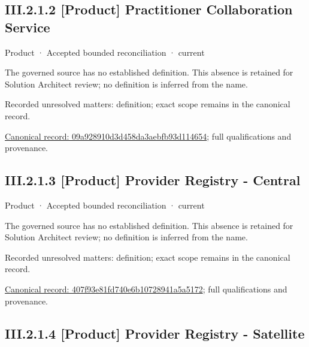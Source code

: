 \subsection*{III.2.1.2 [Product] Practitioner Collaboration Service}
\label{navigation:III.2.1.2}

\label{element:09a928910d3d458da3aebfb93d114654}
{\small Product · Accepted bounded reconciliation · current}\par

The governed source has no established definition. This absence is retained for Solution Architect review; no definition is inferred from the name.


{\small Recorded unresolved matters: definition; exact scope remains in the canonical record.}\par
{\footnotesize \href{../../../../continuum/business/product/09a928910d3d458da3aebfb93d114654.md}{Canonical record: 09a928910d3d458da3aebfb93d114654}; full qualifications and provenance.}\par
\subsection*{III.2.1.3 [Product] Provider Registry - Central}
\label{navigation:III.2.1.3}

\label{element:407f93e81fd740e6b10728941a5a5172}
{\small Product · Accepted bounded reconciliation · current}\par

The governed source has no established definition. This absence is retained for Solution Architect review; no definition is inferred from the name.


{\small Recorded unresolved matters: definition; exact scope remains in the canonical record.}\par
{\footnotesize \href{../../../../continuum/business/product/407f93e81fd740e6b10728941a5a5172.md}{Canonical record: 407f93e81fd740e6b10728941a5a5172}; full qualifications and provenance.}\par
\subsection*{III.2.1.4 [Product] Provider Registry - Satellite}
\label{navigation:III.2.1.4}

